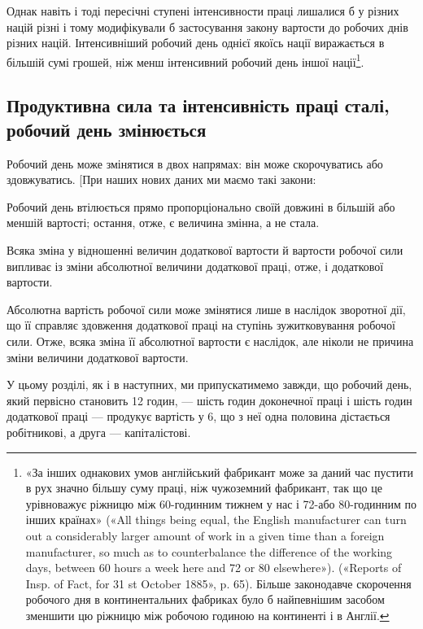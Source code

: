 \parcont{}  %
Однак навіть і тоді пересічні ступені інтенсивности праці лишалися
б у різних націй різні і тому модифікували б застосування
закону вартости до робочих днів різних націй. Інтенсивніший
робочий день однієї якоїсь нації виражається в більшій сумі
грошей, ніж менш інтенсивний робочий день іншої нації\footnote{
«За інших однакових умов англійський фабрикант може за даний
час пустити в рух значно більшу суму праці, ніж чужоземний фабрикант,
так що це урівноважує ріжницю між 60-годинним тижнем у нас
і 72-або 80-годинним по інших країнах» («All things being equal,
the English manufacturer can turn out a considerably larger amount of
work in a given time than a foreign manufacturer, so much as to counterbalance
the difference of the working days, between 60 hours a week here
and 72 or 80 elsewhere»). («Reports of Insp. of Fact, for 31 st October 1885»,
p. 65). Більше законодавче скорочення робочого дня в континентальних
фабриках було б найпевнішим засобом зменшити цю ріжницю між робочою
годиною на континенті і в Англії.
}.

\subsection{Продуктивна сила та інтенсивність праці сталі, робочий
день змінюється}

Робочий день може змінятися в двох напрямах: він може
скорочуватись або здовжуватись. [При наших нових даних ми
маємо такі закони:

Робочий день втілюється прямо пропорціонально своїй довжині
в більшій або меншій вартості; остання, отже, є величина
змінна, а не стала.

Всяка зміна у відношенні величин додаткової вартости й вартости
робочої сили випливає із зміни абсолютної величини додаткової
праці, отже, і додаткової вартости.

Абсолютна вартість робочої сили може змінятися лише в
наслідок зворотної дії, що її справляє здовження додаткової
праці на ступінь зужитковування робочої сили. Отже, всяка зміна
її абсолютної вартости є наслідок, але ніколи не причина зміни
величини додаткової вартости.

У цьому розділі, як і в наступних, ми припускатимемо завжди,
що робочий день, який первісно становить 12 годин, — шість
годин доконечної праці і шість годин додаткової праці — продукує
вартість у 6, що з неї одна половина дістається
робітникові, а друга — капіталістові.

